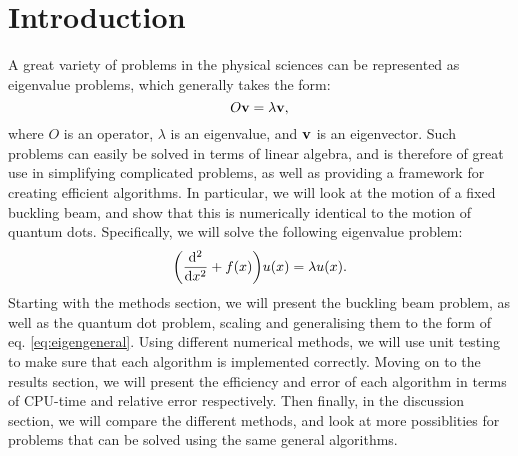 \section{Introduction}
\label{sec:introduction}

A great variety of problems in the physical sciences can be represented as
eigenvalue problems, which generally takes the form:
  \begin{equation}
    \label{eq:eigengeneral}
    O\vb{v} = \lambda \vb{v},
  \end{equation}
where $O$ is an operator, $\lambda$ is an eigenvalue, and $\vb{v}$ is an eigenvector.
Such problems can easily be solved in terms of linear algebra, and is therefore
of great use in simplifying complicated problems, as well as providing a framework for creating efficient
algorithms.
In particular, we will look at the motion of a fixed buckling beam, and show that this is numerically
identical to the motion of quantum dots. Specifically, we will solve the following
eigenvalue problem:
  \begin{equation}
  \label{eq:eigenspecial}
    \qty(\dv[2]{}{x} + f\qty(x))u\qty(x) = \lambda u\qty(x).
  \end{equation}
Starting with the methods section, we will present the buckling beam problem, as well
as the quantum dot problem, scaling and generalising them to the form of eq. \ref{eq:eigengeneral}.
Using different numerical methods, we will use unit testing to make sure that each
algorithm is implemented correctly.
Moving on to the results section, we will present the efficiency and error of each
algorithm in terms of CPU-time and relative error respectively. Then finally,
in the discussion section, we will compare the different methods, and look at
more possiblities for problems that can be solved using the same general algorithms.

